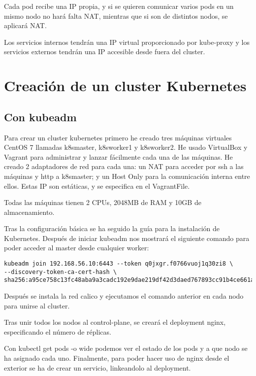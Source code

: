 \documentclass[]{article}
\begin{document}
Cada pod recibe una IP propia, y si se quieren comunicar varios pods en un mismo nodo no hará falta NAT, mientras que si son de distintos nodos, se aplicará NAT.

Los servicios internos tendrán una IP virtual proporcionado por kube-proxy y los servicios externos tendrán una IP accesible desde fuera del cluster.


\section{Creación de un cluster Kubernetes}

\subsection{Con kubeadm}

Para crear un cluster kubernetes primero he creado tres máquinas virtuales CentOS 7 llamadas k8smaster, k8sworker1 y k8sworker2. He usado VirtualBox y Vagrant para administrar y lanzar fácilmente cada una de las máquinas. He creado 2 adaptadores de red para cada una: un NAT para acceder por ssh a las máquinas y http a k8smaster; y un Host Only para la comunicación interna entre ellos. Estas IP son estáticas, y se especifica en el VagrantFile.

Todas las máquinas tienen 2 CPUs, 2048MB de RAM y 10GB de almacenamiento.

Tras la configuración básica se ha seguido la guía para la instalación de Kubernetes\cite{k8sinstallation}. Después de iniciar kubeadm nos mostrará el siguiente comando para poder acceder al master desde cualquier worker:

\begin{verbatim}
kubeadm join 192.168.56.10:6443 --token q0jxgr.f0766vuoj1q30zi8 \
--discovery-token-ca-cert-hash \
sha256:a95ce758c13fc48aba9a3cadc192e9dae219df42d3daed767893cc91b4ce661a
\end{verbatim}
 
Después se instala la red calico y ejecutamos el comando anterior en cada nodo para unirse al cluster.

Tras unir todos los nodos al control-plane, se creará el deployment nginx, especificando el número de réplicas.

Con kubectl get pods -o wide podemos ver el estado de los pods y a que nodo se ha asignado cada uno. Finalmente, para poder hacer uso de nginx desde el exterior se ha de crear un servicio, linkeandolo al deployment.
\end{document}
